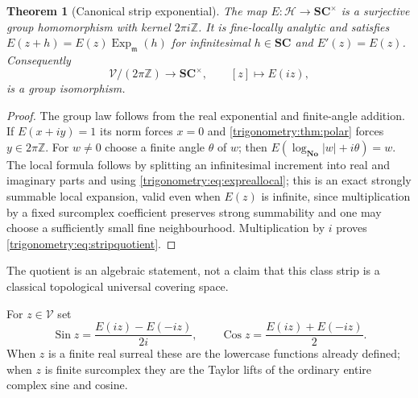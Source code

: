 \documentclass[11pt,letterpaper]{article}
\numberwithin{equation}{section}
\newtheorem{theorem}{Theorem}[section]
\theoremstyle{definition}
\theoremstyle{remark}
\newcommand{\No}{\mathbf{No}}
\newcommand{\SC}{\mathbf{SC}}
\newcommand{\Z}{\mathbb Z}
\newcommand{\mm}{\mathfrak m}
\newcommand{\Ex}{\operatorname{Exp}_{\mm}}
\newcommand{\Sin}{\operatorname{Sin}}
\newcommand{\Cos}{\operatorname{Cos}}
\begin{document}
\begin{theorem}[Canonical strip exponential]\label{trigonometry:thm:stripexp}
The map $E:\mathscr H\to\SC^\times$ is a surjective group homomorphism with kernel $2\pi i\Z$. It
is fine-locally analytic and satisfies $E(z+h)=E(z)\Ex(h)$ for infinitesimal $h\in\SC$ and
$E'(z)=E(z)$. Consequently
\begin{equation}\label{trigonometry:eq:stripquotient}
 \mathscr V/(2\pi\Z)\longrightarrow\SC^\times,\qquad [z]\longmapsto E(iz),
\end{equation}
is a group isomorphism.
\end{theorem}
\begin{proof}
The group law follows from the real exponential and finite-angle addition. If $E(x+iy)=1$ its norm
forces $x=0$ and \cref{trigonometry:thm:polar} forces $y\in2\pi\Z$. For $w\ne0$ choose a finite
angle $\theta$ of $w$; then $E(\log_{\No}|w|+i\theta)=w$. The local formula follows by splitting an
infinitesimal increment into real and imaginary parts and using
\cref{trigonometry:eq:expreallocal}; this is an exact strongly summable local expansion, valid even
when $E(z)$ is infinite, since multiplication by a fixed surcomplex coefficient preserves strong
summability and one may choose a sufficiently small fine neighbourhood. Multiplication by $i$
proves \cref{trigonometry:eq:stripquotient}.
\end{proof}
The quotient is an algebraic statement, not a claim that this class strip is a classical
topological universal covering space.

\begin{definition}\label{trigonometry:def:stripsincos}
For $z\in\mathscr V$ set
\begin{equation}\label{trigonometry:eq:stripsincos}
 \Sin z=\frac{E(iz)-E(-iz)}{2i},\qquad \Cos z=\frac{E(iz)+E(-iz)}2 .
\end{equation}
When $z$ is a finite real surreal these are the lowercase functions already defined; when $z$ is
finite surcomplex they are the Taylor lifts of the ordinary entire complex sine and cosine.
\end{definition}
\end{document}
